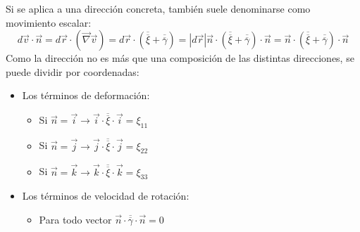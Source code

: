 Si se aplica a una dirección concreta, también suele denominarse como movimiento escalar:
\[d\vec{v}\cdot\vec{n}=d\vec{r}\cdot\left(\vec{\nabla}\vec{v}\right)=d\vec{r}\cdot\left(\overline{\overline{\xi}}+\overline{\overline{\gamma}}\right)=|d\vec{r}|\vec{n}\cdot\left(\overline{\overline{\xi}}+\overline{\overline{\gamma}}\right)\cdot\vec{n}=\vec{n}\cdot\left(\overline{\overline{\xi}}+\overline{\overline{\gamma}}\right)\cdot\vec{n}\]
Como la dirección no es más que una composición de las distintas direcciones, se puede dividir por coordenadas:
\begin{itemize}
	\item Los términos de deformación:
	\begin{itemize}
		\item Si $\vec{n}=\vec{i}\rightarrow\vec{i}\cdot\overline{\overline{\xi}}\cdot\vec{i}=\xi_{11}$
		\item Si $\vec{n}=\vec{j}\rightarrow\vec{j}\cdot\overline{\overline{\xi}}\cdot\vec{j}=\xi_{22}$
		\item Si $\vec{n}=\vec{k}\rightarrow\vec{k}\cdot\overline{\overline{\xi}}\cdot\vec{k}=\xi_{33}$
	\end{itemize}
	\item Los términos de velocidad de rotación:
	\begin{itemize}
		\item Para todo vector $\vec{n}\cdot\overline{\overline{\gamma}}\cdot\vec{n}=0$
	\end{itemize}
\end{itemize}

